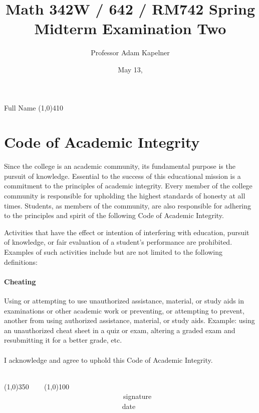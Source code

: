 \documentclass[12pt]{article}
\title{Math 342W / 642 / RM742 Spring \the\year{} \\ Midterm Examination Two}
\author{Professor Adam Kapelner}
\date{May 13, \the\year{}}
\begin{document}
\maketitle

\noindent Full Name \line(1,0){410}

\thispagestyle{empty}

\section*{Code of Academic Integrity}

\footnotesize
Since the college is an academic community, its fundamental purpose is the pursuit of knowledge. Essential to the success of this educational mission is a commitment to the principles of academic integrity. Every member of the college community is responsible for upholding the highest standards of honesty at all times. Students, as members of the community, are also responsible for adhering to the principles and spirit of the following Code of Academic Integrity.

Activities that have the effect or intention of interfering with education, pursuit of knowledge, or fair evaluation of a student's performance are prohibited. Examples of such activities include but are not limited to the following definitions:

\paragraph{Cheating} Using or attempting to use unauthorized assistance, material, or study aids in examinations or other academic work or preventing, or attempting to prevent, another from using authorized assistance, material, or study aids. Example: using an unauthorized cheat sheet in a quiz or exam, altering a graded exam and resubmitting it for a better grade, etc.\\
\\
\noindent I acknowledge and agree to uphold this Code of Academic Integrity. \\~\\

\begin{center}
\line(1,0){350} ~~~ \line(1,0){100}\\
~~~~~~~~~~~~~~~~~~~~~~~~~~~~~~~~~~signature~~~~~~~~~~~~~~~~~~~~~~~~~~~~~~~~~~~~~~~~~~~~~~~~~~~~~~~~~~~~~~ date
\end{center}

\normalsize
\end{document}
